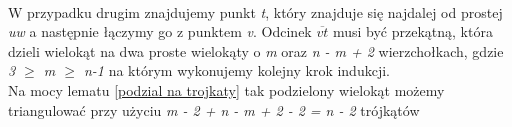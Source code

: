 \documentclass[brudnopis]{xmgr}
\begin{document}
\\\indent W przypadku drugim znajdujemy punkt \textit{t}, który znajduje się najdalej od prostej \textit{uw} a następnie łączymy go z punktem \textit{v}. Odcinek $\overline{v t}$ musi być przekątną, która dzieli wielokąt na dwa proste wielokąty o \textit{m} oraz \textit{n - m + 2} wierzchołkach, gdzie \textit{3 $\ge$ m $\ge$ n-1} na którym wykonujemy kolejny krok indukcji.
\\\indent Na mocy lematu \ref{podzial na trojkaty} tak podzielony wielokąt możemy triangulować przy użyciu \textit{m - 2 + n - m + 2 - 2 = n - 2} trójkątów






\end{document}
